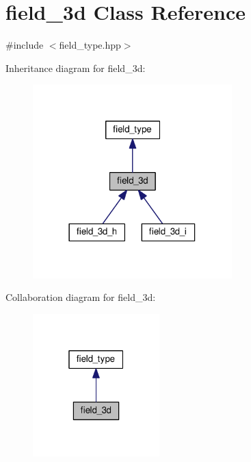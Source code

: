 \hypertarget{classfield__3d}{}\section{field\+\_\+3d Class Reference}
\label{classfield__3d}


{\ttfamily \#include $<$field\+\_\+type.\+hpp$>$}



Inheritance diagram for field\+\_\+3d\+:
\nopagebreak
\begin{figure}[H]
\begin{center}
\leavevmode
\includegraphics[width=218pt]{d0/d2b/classfield__3d__inherit__graph}
\end{center}
\end{figure}


Collaboration diagram for field\+\_\+3d\+:
\nopagebreak
\begin{figure}[H]
\begin{center}
\leavevmode
\includegraphics[width=139pt]{d0/d96/classfield__3d__coll__graph}
\end{center}
\end{figure}
